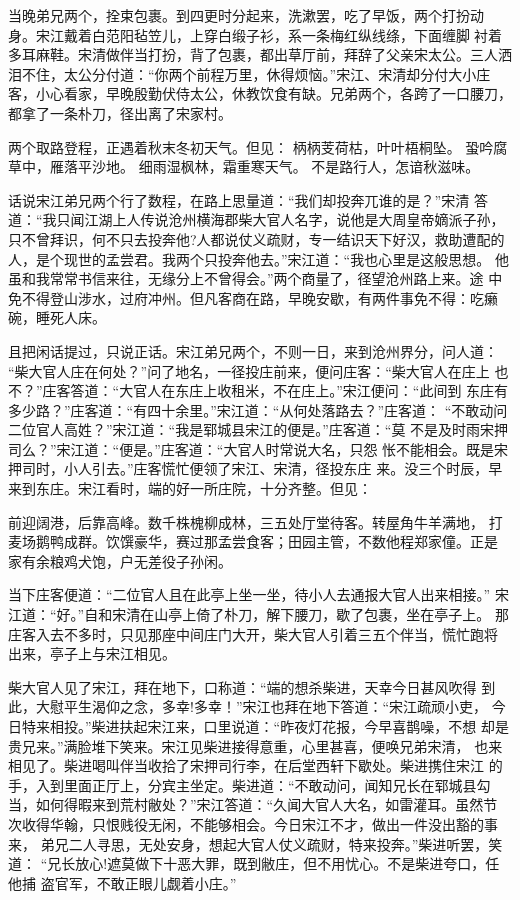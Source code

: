 当晚弟兄两个，拴束包裹。到四更时分起来，洗漱罢，吃了早饭，两个打扮动
身。宋江戴着白范阳毡笠儿，上穿白缎子衫，系一条梅红纵线绦，下面缠脚衬着
多耳麻鞋。宋清做伴当打扮，背了包裹，都出草厅前，拜辞了父亲宋太公。三人洒
泪不住，太公分付道：“你两个前程万里，休得烦恼。”宋江、宋清却分付大小庄
客，小心看家，早晚殷勤伏侍太公，休教饮食有缺。兄弟两个，各跨了一口腰刀，
都拿了一条朴刀，径出离了宋家村。

两个取路登程，正遇着秋末冬初天气。但见：
柄柄芰荷枯，叶叶梧桐坠。
蛩吟腐草中，雁落平沙地。
细雨湿枫林，霜重寒天气。
不是路行人，怎谙秋滋味。

话说宋江弟兄两个行了数程，在路上思量道：“我们却投奔兀谁的是？”宋清
答道：“我只闻江湖上人传说沧州横海郡柴大官人名字，说他是大周皇帝嫡派子孙，
只不曾拜识，何不只去投奔他?人都说仗义疏财，专一结识天下好汉，救助遭配的
人，是个现世的孟尝君。我两个只投奔他去。”宋江道：“我也心里是这般思想。
他虽和我常常书信来往，无缘分上不曾得会。”两个商量了，径望沧州路上来。途
中免不得登山涉水，过府冲州。但凡客商在路，早晚安歇，有两件事免不得：吃癞
碗，睡死人床。

且把闲话提过，只说正话。宋江弟兄两个，不则一日，来到沧州界分，问人道：
“柴大官人庄在何处？”问了地名，一径投庄前来，便问庄客：“柴大官人在庄上
也不？”庄客答道：“大官人在东庄上收租米，不在庄上。”宋江便问：“此间到
东庄有多少路？”庄客道：“有四十余里。”宋江道：“从何处落路去？”庄客道：
“不敢动问二位官人高姓？”宋江道：“我是郓城县宋江的便是。”庄客道：“莫
不是及时雨宋押司么？”宋江道：“便是。”庄客道：“大官人时常说大名，只怨
怅不能相会。既是宋押司时，小人引去。”庄客慌忙便领了宋江、宋清，径投东庄
来。没三个时辰，早来到东庄。宋江看时，端的好一所庄院，十分齐整。但见：

前迎阔港，后靠高峰。数千株槐柳成林，三五处厅堂待客。转屋角牛羊满地，
打麦场鹅鸭成群。饮馔豪华，赛过那孟尝食客；田园主管，不数他程郑家僮。正是
家有余粮鸡犬饱，户无差役子孙闲。

当下庄客便道：“二位官人且在此亭上坐一坐，待小人去通报大官人出来相接。”
宋江道：“好。”自和宋清在山亭上倚了朴刀，解下腰刀，歇了包裹，坐在亭子上。
那庄客入去不多时，只见那座中间庄门大开，柴大官人引着三五个伴当，慌忙跑将
出来，亭子上与宋江相见。

柴大官人见了宋江，拜在地下，口称道：“端的想杀柴进，天幸今日甚风吹得
到此，大慰平生渴仰之念，多幸!多幸！”宋江也拜在地下答道：“宋江疏顽小吏，
今日特来相投。”柴进扶起宋江来，口里说道：“昨夜灯花报，今早喜鹊噪，不想
却是贵兄来。”满脸堆下笑来。宋江见柴进接得意重，心里甚喜，便唤兄弟宋清，
也来相见了。柴进喝叫伴当收拾了宋押司行李，在后堂西轩下歇处。柴进携住宋江
的手，入到里面正厅上，分宾主坐定。柴进道：“不敢动问，闻知兄长在郓城县勾
当，如何得暇来到荒村敝处？”宋江答道：“久闻大官人大名，如雷灌耳。虽然节
次收得华翰，只恨贱役无闲，不能够相会。今日宋江不才，做出一件没出豁的事来，
弟兄二人寻思，无处安身，想起大官人仗义疏财，特来投奔。”柴进听罢，笑道：
“兄长放心!遮莫做下十恶大罪，既到敝庄，但不用忧心。不是柴进夸口，任他捕
盗官军，不敢正眼儿觑着小庄。”

